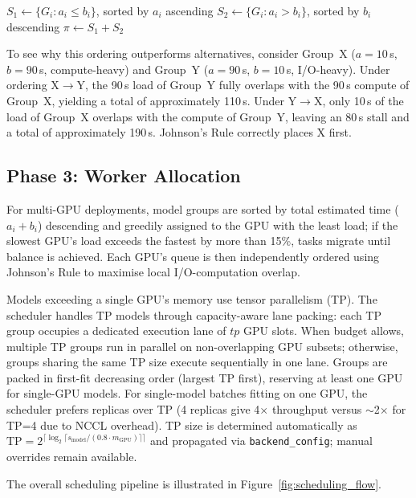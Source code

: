 \documentclass[logo,bsc,singlespacing,parskip,online]{infthesis}
\begin{document}
\begin{algorithmic}
\STATE $S_1 \gets \{G_i : a_i \leq b_i\}$, sorted by $a_i$ ascending
\STATE $S_2 \gets \{G_i : a_i > b_i\}$, sorted by $b_i$ descending
\STATE $\pi \gets S_1 + S_2$
\end{algorithmic}

To see why this ordering outperforms alternatives, consider Group~X ($a=10$\,s, $b=90$\,s, compute-heavy) and Group~Y ($a=90$\,s, $b=10$\,s, I/O-heavy). Under ordering X$\to$Y, the 90\,s load of Group~Y fully overlaps with the 90\,s compute of Group~X, yielding a total of approximately 110\,s. Under Y$\to$X, only 10\,s of the load of Group~X overlaps with the compute of Group~Y, leaving an 80\,s stall and a total of approximately 190\,s. Johnson's Rule correctly places X first.

\subsection{Phase 3: Worker Allocation}
\label{sec:worker_allocation}

For multi-GPU deployments, model groups are sorted by total estimated time ($a_i + b_i$) descending and greedily assigned to the GPU with the least load; if the slowest GPU's load exceeds the fastest by more than 15\%, tasks migrate until balance is achieved. Each GPU's queue is then independently ordered using Johnson's Rule to maximise local I/O-computation overlap.

Models exceeding a single GPU's memory use tensor parallelism (TP). The scheduler handles TP models through capacity-aware lane packing: each TP group occupies a dedicated execution lane of $\textit{tp}$ GPU slots. When budget allows, multiple TP groups run in parallel on non-overlapping GPU subsets; otherwise, groups sharing the same TP size execute sequentially in one lane. Groups are packed in first-fit decreasing order (largest TP first), reserving at least one GPU for single-GPU models. For single-model batches fitting on one GPU, the scheduler prefers replicas over TP (4 replicas give 4$\times$ throughput versus $\sim$2$\times$ for TP=4 due to NCCL overhead). TP size is determined automatically as $\text{TP} = 2^{\lceil \log_2 \lceil s_{\text{model}} / (0.8 \cdot m_{\text{GPU}}) \rceil \rceil}$ and propagated via \texttt{backend\_config}; manual overrides remain available.

The overall scheduling pipeline is illustrated in Figure~\ref{fig:scheduling_flow}.
\end{document}
